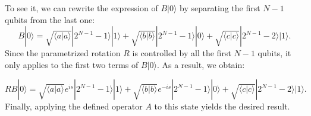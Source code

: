 \documentclass[10pt,letterpaper]{article} %
\begin{document}
To see it, we can rewrite the expression of $B|0\rangle$ by 
separating the first $N-1$ qubits from the last one:
$$B|0\rangle = \sqrt{\langle a | a \rangle} |2^{N-1}-1\rangle |1\rangle + \sqrt{\langle b | b \rangle} |2^{N-1}-1\rangle |0\rangle + \sqrt{\langle c | c \rangle} |2^{N-1}-2\rangle |1\rangle.$$
Since the parametrized rotation $R$ is controlled by all the first $N-1$ qubits, it only applies to the first two terms of $B|0\rangle$. As a result, we obtain:

$$
RB|0\rangle =\sqrt{\langle a | a \rangle} e^{is} |2^{N-1}-1\rangle |1\rangle + \sqrt{\langle b | b \rangle} e^{-is} |2^{N-1}-1\rangle |0\rangle + \sqrt{\langle c | c \rangle} |2^{N-1}-2\rangle |1\rangle.
$$
Finally, applying the defined operator $A$ to this state yields the desired result.
 
\end{document}
